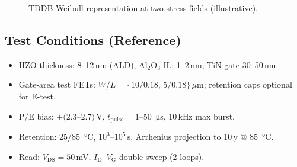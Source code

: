 \documentclass[journal]{IEEEtran}
\begin{document}
\begin{figure}[t]
\centering
{}
\caption{TDDB Weibull representation at two stress fields (illustrative).}
\label{fig:weibull}
\end{figure}

\subsection*{Test Conditions (Reference)}
\begin{itemize}
  \item HZO thickness: 8--12\,nm (ALD), Al$_2$O$_3$ IL: 1--2\,nm; TiN gate 30--50\,nm.
  \item Gate-area test FETs: $W/L=\{10/0.18,\,5/0.18\}\,\mu$m; retention caps optional for E-test.
  \item P/E bias: $\pm(2.3$--$2.7)$\,V, $t_\mathrm{pulse}=1$--\SI{50}{\micro\second}, 10\,kHz max burst.
  \item Retention: 25/\SI{85}{\celsius}, $10^3$--$10^5$\,s, Arrhenius projection to 10\,y @ \SI{85}{\celsius}.
  \item Read: $V_\mathrm{DS}=50$\,mV, $I_\mathrm{D}$--$V_\mathrm{G}$ double-sweep (2 loops).
\end{itemize}
\end{document}
